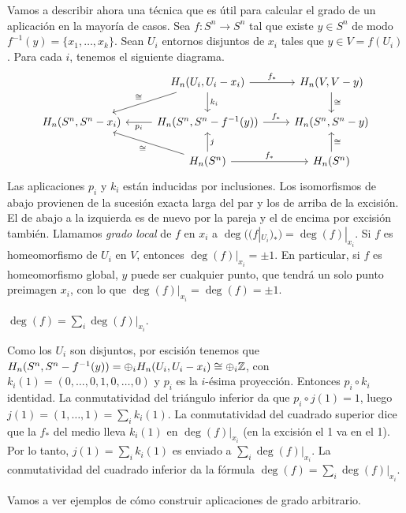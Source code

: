 \documentclass[TA.tex]{subfiles}
\begin{document}
Vamos a describir ahora una técnica que es útil para calcular el grado de un aplicación en la mayoría de casos. Sea $f:S^n\to S^n$ tal que existe $y\in S^n$ de modo $f^{-1}(y)=\{x_1,\dots, x_k\}$. Sean $U_i$ entornos disjuntos de $x_i$ tales que $y\in V=f(U_i)$. Para cada $i$, tenemos el siguiente diagrama. 
\[
\begin{tikzcd}
& H_n(U_i, U_i-x_i)\arrow[dl, "\cong"']\arrow[r, "f_*"]\arrow[d, "k_i"] & H_n(V, V-y)\arrow[d, "\cong"]\\
H_n(S^n, S^n-x_i) & H_n(S^n, S^n-f^{-1}(y))\arrow[l, "p_i"]\arrow[r, "f_*"] & H_n(S^n, S^n-y) \\
& H_n(S^n)\arrow[ul, "\cong"]\arrow[u, "j"']\arrow[r, "f_*"] & H_n(S^n)\arrow[u, "\cong"']
\end{tikzcd}
\]
Las aplicaciones $p_i$ y $k_i$ están inducidas por inclusiones. Los isomorfismos de abajo provienen de la sucesión exacta larga del par y los de arriba de la excisión. El de abajo a la izquierda es de nuevo por la pareja y el de encima por excisión también. Llamamos \emph{grado local} de $f$ en $x_i$ a $\deg((f|_{U_i})_*)=\deg(f)|_{x_i}$. Si $f$ es homeomorfismo de $U_i$ en $V$, entonces $\deg(f)|_{x_i}=\pm 1$. En particular, si $f$ es homeomorfismo global, $y$ puede ser cualquier punto, que tendrá un solo punto preimagen $x_i$, con lo que $\deg(f)|_{x_i}=\deg(f)=\pm 1$.

\begin{prop}
$\deg(f)=\sum_i \deg(f)|_{x_i}$. 
\end{prop}
\begin{dem}
Como los $U_i$ son disjuntos, por escisión tenemos que $H_n(S^n, S^n-f^{-1}(y))=\oplus_i H_n(U_i, U_i-x_i)\cong\oplus_i\mathbb{Z}$, con $k_i(1)=(0,\dots,0, 1,0,\dots, 0)$ y $p_i$ es la $i$-ésima proyección. Entonces $p_i\circ k_i$ identidad. La conmutatividad del triángulo inferior da que $p_i\circ j(1)=1$, luego $j(1)=(1,\dots, 1)=\sum_ik_i(1)$. La conmutatividad del cuadrado superior dice que la $f_*$ del medio lleva $k_i(1)$ en $\deg(f)|_{x_i}$ (en la excisión el 1 va en el 1). Por lo tanto, $j(1)=\sum_ik_i(1)$ es enviado a $\sum_i \deg(f)|_{x_i}$. La conmutatividad del cuadrado inferior da la fórmula $\deg(f)=\sum_i \deg(f)|_{x_i}$.
\end{dem}

Vamos a ver ejemplos de cómo construir aplicaciones de grado arbitrario.
\end{document}
